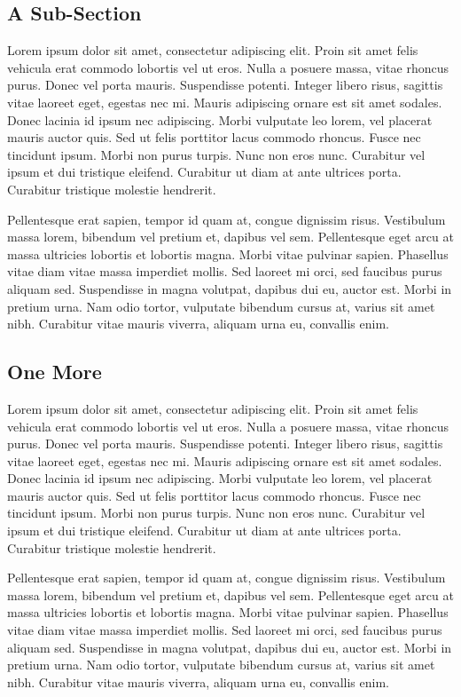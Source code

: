 \documentclass{vitmsprojectreport}
\begin{document}
\subsection{A Sub-Section}

Lorem ipsum dolor sit amet, consectetur adipiscing elit. Proin sit amet felis vehicula erat commodo lobortis vel ut eros. Nulla a posuere massa, vitae rhoncus purus. Donec vel porta mauris. Suspendisse potenti. Integer libero risus, sagittis vitae laoreet eget, egestas nec mi. Mauris adipiscing ornare est sit amet sodales. Donec lacinia id ipsum nec adipiscing. Morbi vulputate leo lorem, vel placerat mauris auctor quis. Sed ut felis porttitor lacus commodo rhoncus. Fusce nec tincidunt ipsum. Morbi non purus turpis. Nunc non eros nunc. Curabitur vel ipsum et dui tristique eleifend. Curabitur ut diam at ante ultrices porta. Curabitur tristique molestie hendrerit.

Pellentesque erat sapien, tempor id quam at, congue dignissim risus. Vestibulum massa lorem, bibendum vel pretium et, dapibus vel sem. Pellentesque eget arcu at massa ultricies lobortis et lobortis magna. Morbi vitae pulvinar sapien. Phasellus vitae diam vitae massa imperdiet mollis. Sed laoreet mi orci, sed faucibus purus aliquam sed. Suspendisse in magna volutpat, dapibus dui eu, auctor est. Morbi in pretium urna. Nam odio tortor, vulputate bibendum cursus at, varius sit amet nibh. Curabitur vitae mauris viverra, aliquam urna eu, convallis enim.

\subsection{One More}

Lorem ipsum dolor sit amet, consectetur adipiscing elit. Proin sit amet felis vehicula erat commodo lobortis vel ut eros. Nulla a posuere massa, vitae rhoncus purus. Donec vel porta mauris. Suspendisse potenti. Integer libero risus, sagittis vitae laoreet eget, egestas nec mi. Mauris adipiscing ornare est sit amet sodales. Donec lacinia id ipsum nec adipiscing. Morbi vulputate leo lorem, vel placerat mauris auctor quis. Sed ut felis porttitor lacus commodo rhoncus. Fusce nec tincidunt ipsum. Morbi non purus turpis. Nunc non eros nunc. Curabitur vel ipsum et dui tristique eleifend. Curabitur ut diam at ante ultrices porta. Curabitur tristique molestie hendrerit.

Pellentesque erat sapien, tempor id quam at, congue dignissim risus. Vestibulum massa lorem, bibendum vel pretium et, dapibus vel sem. Pellentesque eget arcu at massa ultricies lobortis et lobortis magna. Morbi vitae pulvinar sapien. Phasellus vitae diam vitae massa imperdiet mollis. Sed laoreet mi orci, sed faucibus purus aliquam sed. Suspendisse in magna volutpat, dapibus dui eu, auctor est. Morbi in pretium urna. Nam odio tortor, vulputate bibendum cursus at, varius sit amet nibh. Curabitur vitae mauris viverra, aliquam urna eu, convallis enim.
\end{document}
